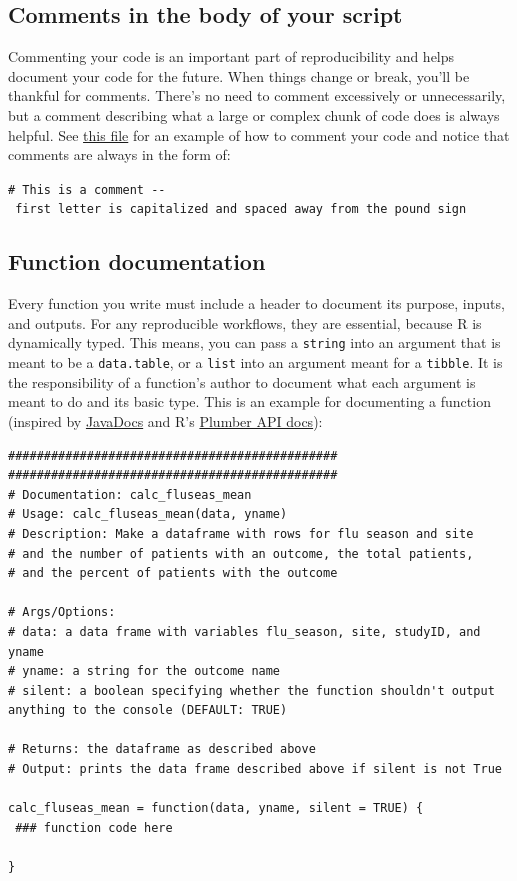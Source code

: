 \documentclass[
]{book}
\begin{document}
\subsection{Comments in the body of your script}\label{comments-in-the-body-of-your-script}

Commenting your code is an important part of reproducibility and helps document your code for the future. When things change or break, you'll be thankful for comments. There's no need to comment excessively or unnecessarily, but a comment describing what a large or complex chunk of code does is always helpful. See \href{https://github.com/kmishra9/Flu-Absenteeism/blob/master/Master's\%20Thesis\%20-\%20Spatial\%20Epidemiology\%20of\%20Influenza/1b\%20-\%20Map-Management.R}{this file} for an example of how to comment your code and notice that comments are always in the form of:

\texttt{\#\ This\ is\ a\ comment\ -\/-\ first\ letter\ is\ capitalized\ and\ spaced\ away\ from\ the\ pound\ sign}

\subsection{Function documentation}\label{function-documentation}

Every function you write must include a header to document its purpose, inputs, and outputs. For any reproducible workflows, they are essential, because R is dynamically typed. This means, you can pass a \texttt{string} into an argument that is meant to be a \texttt{data.table}, or a \texttt{list} into an argument meant for a \texttt{tibble}. It is the responsibility of a function's author to document what each argument is meant to do and its basic type. This is an example for documenting a function (inspired by \href{https://www.oracle.com/technetwork/java/javase/documentation/index-137868.html\#format}{JavaDocs} and R's \href{https://blog.rstudio.com/2018/10/23/rstudio-1-2-preview-plumber-integration/}{Plumber API docs}):

\begin{verbatim}
##############################################
##############################################
# Documentation: calc_fluseas_mean
# Usage: calc_fluseas_mean(data, yname)
# Description: Make a dataframe with rows for flu season and site
# and the number of patients with an outcome, the total patients,
# and the percent of patients with the outcome

# Args/Options:
# data: a data frame with variables flu_season, site, studyID, and yname
# yname: a string for the outcome name
# silent: a boolean specifying whether the function shouldn't output anything to the console (DEFAULT: TRUE)

# Returns: the dataframe as described above
# Output: prints the data frame described above if silent is not True

calc_fluseas_mean = function(data, yname, silent = TRUE) {
 ### function code here 

}
\end{verbatim}
\end{document}

